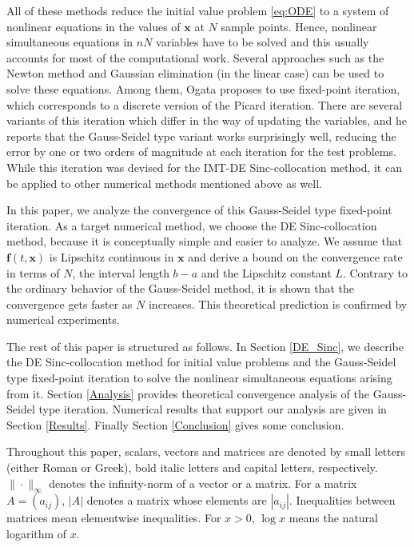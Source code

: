 \documentclass[pdflatex,sn-mathphys-num]{sn-jnl}%
\theoremstyle{thmstyleone}%
\theoremstyle{thmstyletwo}%
\theoremstyle{thmstylethree}%
\begin{document}
All of these methods reduce the initial value problem \eqref{eq:ODE} to a system of nonlinear equations in the values of ${\bm x}$ at $N$ sample points. Hence, nonlinear simultaneous equations in $nN$ variables have to be solved and this usually accounts for most of the computational work. Several approaches such as the Newton method and Gaussian elimination (in the linear case) \cite{Nurmuhammad05} can be used to solve these equations. Among them, Ogata \cite{Ogata23} proposes to use fixed-point iteration, which corresponds to a discrete version of the Picard iteration. There are several variants of this iteration which differ in the way of updating the variables, and he reports that the Gauss-Seidel type variant works surprisingly well, reducing the error by one or two orders of magnitude at each iteration for the test problems. While this iteration was devised for the IMT-DE Sinc-collocation method, it can be applied to other numerical methods mentioned above as well.

In this paper, we analyze the convergence of this Gauss-Seidel type fixed-point iteration. As a target numerical method, we choose the DE Sinc-collocation method, because it is conceptually simple and easier to analyze. We assume that ${\bm f}(t,{\bm x})$ is Lipschitz continuous in ${\bm x}$ and derive a bound on the convergence rate in terms of $N$, the interval length $b-a$ and the Lipschitz constant $L$. Contrary to the ordinary behavior of the Gauss-Seidel method, it is shown that the convergence gets faster as $N$ increases. This theoretical prediction is confirmed by numerical experiments.

The rest of this paper is structured as follows. In Section \ref{DE_Sinc}, we describe the DE Sinc-collocation method for initial value problems and the Gauss-Seidel type fixed-point iteration to solve the nonlinear simultaneous equations arising from it. Section \ref{Analysis} provides theoretical convergence analysis of the Gauss-Seidel type iteration. Numerical results that support our analysis are given in Section \ref{Results}. Finally Section \ref{Conclusion} gives some conclusion.

Throughout this paper, scalars, vectors and matrices are denoted by small letters (either Roman or Greek), bold italic letters and capital letters, respectively. $\|\cdot\|_{\infty}$ denotes the infinity-norm of a vector or a matrix. For a matrix $A=(a_{ij})$, $|A|$ denotes a matrix whose elements are $|a_{ij}|$. Inequalities between matrices mean elementwise inequalities. For $x>0$, $\log x$ means the natural logarithm of $x$.
\end{document}
